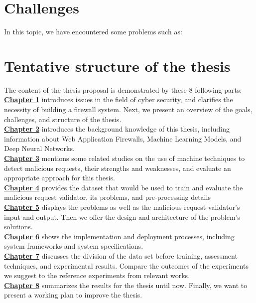 \section{Challenges}
\label{sec:challenges}
In this topic, we have encountered some problems such as:
\section{Tentative structure of the thesis}
\label{sec:structure}
	\newcommand\nextintro{\\[4mm]}
	The content of the thesis proposal is demonstrated by these 8 following parts: \nextintro
	\hyperref[chap:introduction]{\textbf{Chapter 1}} introduces issues in the field of cyber security, and clarifies the necessity of building a firewall system. Next, we present an overview of the goals, challenges, and structure of the thesis.\nextintro
	\hyperref[chap:backgrounds]{\textbf{Chapter 2}} introduces the background knowledge of this thesis, including information about Web Application Firewalls, Machine Learning Models, and Deep Neural Networks.\nextintro
	\hyperref[chap:literaturereview]{\textbf{Chapter 3}} mentions some related studies on the use of machine techniques to detect malicious requests, their strengths and weaknesses, and evaluate an appropriate approach for this thesis.\nextintro
	\hyperref[chap:dataset]{\textbf{Chapter 4}} provides the dataset that would be used to train and evaluate the malicious request validator, its problems, and pre-processing details\nextintro
	\hyperref[chap:proposed_approach]{\textbf{Chapter 5}} displays the problems as well as the malicious request validator's input and output. Then we offer the design and architecture of the problem's solutions.\nextintro
	\hyperref[chap:implementation]{\textbf{Chapter 6}} shows the implementation and deployment processes, including system frameworks and system specifications.\nextintro
	\hyperref[chap:experiments]{\textbf{Chapter 7}} discusses the division of the data set before training, assessment techniques, and experimental results. Compare the outcomes of the experiments we suggest to the reference experiments from relevant works.\nextintro
	\hyperref[chap:conclusion]{\textbf{Chapter 8}} summarizes the results for the thesis until now. Finally, we want to present a working plan to improve the thesis.\nextintro
